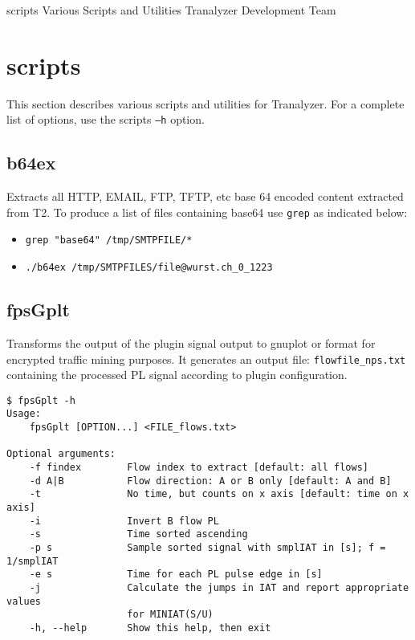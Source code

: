 \documentclass[documentation]{subfiles}
\begin{document}
\trantitle
    {scripts}
    {Various Scripts and Utilities}
    {Tranalyzer Development Team} %

\section{scripts}\label{s:scripts}
This section describes various scripts and utilities for Tranalyzer.
For a complete list of options, use the scripts {\tt --h} option.

\subsection{b64ex}
Extracts all HTTP, EMAIL, FTP, TFTP, etc base 64 encoded content extracted from T2.
To produce a list of files containing base64 use {\tt grep} as indicated below:
\begin{itemize}
    \item {\tt grep "base64" /tmp/SMTPFILE/*}
    \item {\tt ./b64ex /tmp/SMTPFILES/file@wurst.ch\_0\_1223}
\end{itemize}

\subsection{fpsGplt}
Transforms the output of the  plugin signal output to gnuplot or  format for encrypted traffic mining purposes.
It generates an output file: {\tt flowfile\_nps.txt} containing the processed PL signal according to  plugin configuration.

\begin{center}
\begin{verbatim}
$ fpsGplt -h
Usage:
    fpsGplt [OPTION...] <FILE_flows.txt>

Optional arguments:
    -f findex        Flow index to extract [default: all flows]
    -d A|B           Flow direction: A or B only [default: A and B]
    -t               No time, but counts on x axis [default: time on x axis]
    -i               Invert B flow PL
    -s               Time sorted ascending
    -p s             Sample sorted signal with smplIAT in [s]; f = 1/smplIAT
    -e s             Time for each PL pulse edge in [s]
    -j               Calculate the jumps in IAT and report appropriate values
                     for MINIAT(S/U)
    -h, --help       Show this help, then exit
\end{verbatim}
\end{center}
\end{document}
